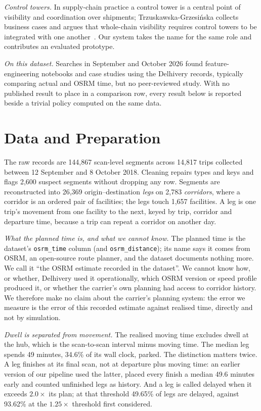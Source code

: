 \documentclass[conference]{IEEEtran}
\begin{document}
\textit{Control towers.} In supply-chain practice a control tower is a central point of visibility and coordination over shipments; Trzuskawska-Grzesi\'{n}ska collects business cases and argues that whole-chain visibility requires control towers to be integrated with one another~\cite{controltower}. Our system takes the name for the same role and contributes an evaluated prototype.

\textit{On this dataset.} Searches in September and October 2026 found feature-engineering notebooks and case studies using the Delhivery records, typically comparing actual and OSRM time, but no peer-reviewed study. With no published result to place in a comparison row, every result below is reported beside a trivial policy computed on the same data.

\section{Data and Preparation}

The raw records are 144,867 scan-level segments across 14,817 trips collected between 12 September and 8 October 2018. Cleaning repairs types and keys and flags 2,600 suspect segments without dropping any row. Segments are reconstructed into 26,369 origin--destination \emph{legs} on 2,783 \emph{corridors}, where a corridor is an ordered pair of facilities; the legs touch 1,657 facilities. A leg is one trip's movement from one facility to the next, keyed by trip, corridor and departure time, because a trip can repeat a corridor on another day.

\textit{What the planned time is, and what we cannot know.} The planned time is the dataset's \texttt{osrm\_time} column (and \texttt{osrm\_distance}); its name says it comes from OSRM, an open-source route planner, and the dataset documents nothing more. We call it ``the OSRM estimate recorded in the dataset''. We cannot know how, or whether, Delhivery used it operationally, which OSRM version or speed profile produced it, or whether the carrier's own planning had access to corridor history. We therefore make no claim about the carrier's planning system: the error we measure is the error of this recorded estimate against realised time, directly and not by simulation.

\textit{Dwell is separated from movement.} The realised moving time excludes dwell at the hub, which is the scan-to-scan interval minus moving time. The median leg spends 49 minutes, 34.6\% of its wall clock, parked. The distinction matters twice. A leg finishes at its final scan, not at departure plus moving time: an earlier version of our pipeline used the latter, placed every finish a median 49.6 minutes early and counted unfinished legs as history. And a leg is called delayed when it exceeds $2.0\times$ its plan; at that threshold 49.65\% of legs are delayed, against 93.62\% at the $1.25\times$ threshold first considered.
\end{document}

